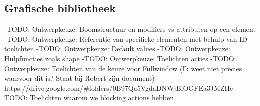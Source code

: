 \subsection{Grafische bibliotheek} \label{subsec:grafische_bibliotheek}

-TODO: Ontwerpkeuze: Boomstructuur en modifiers vs attributen op een element
-TODO: Ontwerpkeuze: Referentie van specifieke elementen met behulp van ID toelichten
-TODO: Ontwerpkeuze: Default values
-TODO: Ontwerpkeuze: Hulpfuncties zoals shape
-TODO: Ontwerpkeuze: Toelichten acties
-TODO: Ontwerpkeuze: Toelichten van de keuze voor Fullwindow (Ik weet niet precies waarvoor dit is? Staat bij Robert zijn document) https://drive.google.com/#folders/0B97Qa5VgdaDNWjBiOGFEa3JMZHc
-TODO: Toelichten waarom we blocking actions hebben
